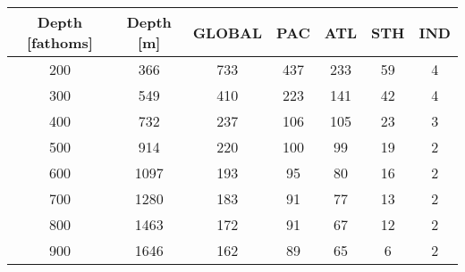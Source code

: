 \documentclass[12pt]{article}
\begin{document}
\begin{table}%
\small
\begin{tabular}{|c|c|ccccc|}
\hline
Depth [fathoms] & Depth [m] & GLOBAL & PAC  & ATL &  STH & IND  \\
\hline 
%
200 &         366     &  733 & 437   &   233   &    59   &     4  \\
300 &         549    &   410 &  223   &   141   &    42   &     4 \\
400  &        732   &    237 &   106   &   105   &    23   &     3 \\
500  &        914   &   220 &    100    &   99   &    19    &    2 \\
600   &      1097   &   193 &     95   &    80   &    16   &     2 \\ 
700   &      1280    &  183 &     91   &    77   &    13   &     2 \\ 
800  &       1463   &   172 &      91   &    67   &    12   &     2 \\ 
900   &      1646    &  162 &      89   &    65   &     6   &     2 \\

\end{tabular}
\end{table}
\end{document}
